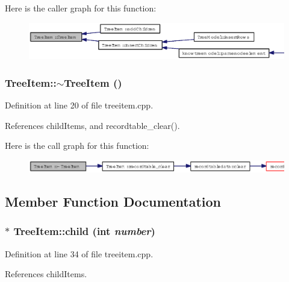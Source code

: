Here is the caller graph for this function:\begin{figure}[H]
\begin{center}
\leavevmode
\includegraphics[width=394pt]{classTreeItem_508184fa6523340f5456e530e492e2a4_icgraph}
\end{center}
\end{figure}
\subsubsection{\setlength{\rightskip}{0pt plus 5cm}Tree\-Item::$\sim$Tree\-Item ()}\label{classTreeItem_859429185d908c3e54861bbbfb185425}




Definition at line 20 of file treeitem.cpp.

References child\-Items, and recordtable\_\-clear().

Here is the call graph for this function:\begin{figure}[H]
\begin{center}
\leavevmode
\includegraphics[width=369pt]{classTreeItem_859429185d908c3e54861bbbfb185425_cgraph}
\end{center}
\end{figure}


\subsection{Member Function Documentation}
\subsubsection{ $\ast$ Tree\-Item::child (int {\em number})}\label{classTreeItem_993f98a911be40cc1466e105b4657bbe}




Definition at line 34 of file treeitem.cpp.

References child\-Items.

